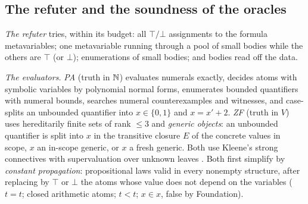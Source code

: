 \subsection{The refuter and the soundness of the oracles}\label{app:exp:oracle}

\emph{The refuter} tries, within its budget: all $\top/\bot$ assignments to the formula metavariables; one metavariable running through a pool of small bodies while the others are $\top$ (or $\bot$); enumerations of small bodies; and bodies read off the data.

\emph{The evaluators.} \emph{PA} (truth in $\mathbb{N}$) evaluates numerals exactly, decides atoms with symbolic variables by polynomial normal forms, enumerates bounded quantifiers with numeral bounds, searches numeral counterexamples and witnesses, and case-splits an unbounded quantifier into $x\in\{0,1\}$ and $x=x'+2$. \emph{ZF} (truth in $V$) uses hereditarily finite sets of rank $\le3$ and \emph{generic objects}: an unbounded quantifier is split into $x$ in the transitive closure $E$ of the concrete values in scope, $x$ an in-scope generic, or $x$ a fresh generic. Both use Kleene's strong connectives \citep{kleene1952introduction} with supervaluation over unknown leaves \citep{vanfraassen1966singular}. Both first simplify by \emph{constant propagation}: propositional laws valid in every nonempty structure, after replacing by $\top$ or $\bot$ the atoms whose value does not depend on the variables ($t=t$; closed arithmetic atoms; $t<t$; $x\in x$, false by Foundation).

